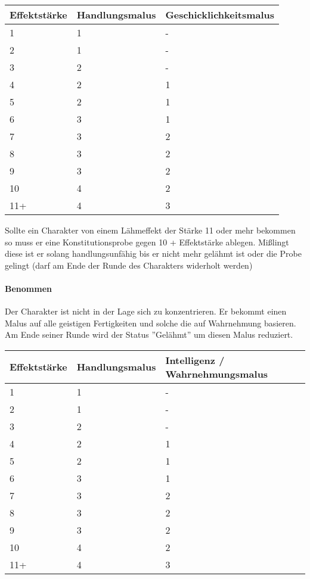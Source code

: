 \documentclass{article}
\begin{document}
\begin{small}
\begin{tabular}{|m{2cm}|m{3cm}|m{6cm}|}
\hline
\textbf{Effektstärke}&\textbf{Handlungsmalus}&\textbf{Geschicklichkeitsmalus}\\
\hline
\hline
1&1&-\\
\hline
2&1&-\\
\hline
3&2&-\\
\hline
4&2&1\\
\hline
5&2&1\\
\hline
6&3&1\\
\hline
7&3&2\\
\hline
8&3&2\\
\hline
9&3&2\\
\hline
10&4&2\\
\hline
11+&4&3\\
\hline
\end{tabular}
\end{small}

Sollte ein Charakter von einem Lähmeffekt der Stärke 11 oder mehr bekommen so muss er eine Konstitutionsprobe gegen
10 + Effektstärke ablegen. Mißlingt diese ist er solang handlungsunfähig bis er nicht mehr gelähmt ist oder die Probe
gelingt (darf am Ende der Runde des Charakters widerholt werden)

\paragraph{Benommen}

Der Charakter ist nicht in der Lage sich zu konzentrieren. Er bekommt einen Malus auf alle geistigen Fertigkeiten und
solche die auf Wahrnehmung basieren. Am Ende seiner Runde wird der Status ''Gelähmt'' um diesen Malus reduziert.


\begin{small}
\begin{tabular}{|m{2cm}|m{3cm}|m{6cm}|}
\hline
\textbf{Effektstärke}&\textbf{Handlungsmalus}&\textbf{Intelligenz / Wahrnehmungsmalus}\\
\hline
\hline
1&1&-\\
\hline
2&1&-\\
\hline
3&2&-\\
\hline
4&2&1\\
\hline
5&2&1\\
\hline
6&3&1\\
\hline
7&3&2\\
\hline
8&3&2\\
\hline
9&3&2\\
\hline
10&4&2&\\
\hline
11+&4&3\\
\hline
\end{tabular}
\end{small}
\end{document}
